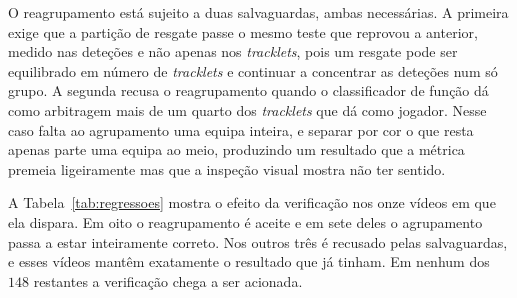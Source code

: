 O reagrupamento está sujeito a duas salvaguardas, ambas necessárias. A primeira exige que a partição de resgate passe o mesmo teste que reprovou a anterior, medido nas deteções e não apenas nos \emph{tracklets}, pois um resgate pode ser equilibrado em número de \emph{tracklets} e continuar a concentrar as deteções num só grupo. A segunda recusa o reagrupamento quando o classificador de função dá como arbitragem mais de um quarto dos \emph{tracklets} que dá como jogador. Nesse caso falta ao agrupamento uma equipa inteira, e separar por cor o que resta apenas parte uma equipa ao meio, produzindo um resultado que a métrica premeia ligeiramente mas que a inspeção visual mostra não ter sentido.

A Tabela~\ref{tab:regressoes} mostra o efeito da verificação nos onze vídeos em que ela dispara. Em oito o reagrupamento é aceite e em sete deles o agrupamento passa a estar inteiramente correto. Nos outros três é recusado pelas salvaguardas, e esses vídeos mantêm exatamente o resultado que já tinham. Em nenhum dos $148$ restantes a verificação chega a ser acionada.


